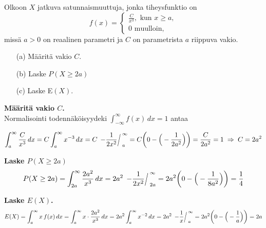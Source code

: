 \documentclass[12pt,a4paper]{article}
\begin{document}
\pagebreak
{}
Olkoon $X$ jatkuva satunnaismuuttuja, jonka tiheysfunktio on 
$$f(x)=\begin{cases}
    \frac{C}{x^{3}},\text{ kun }x\ge a,\\
    0 \text{ muulloin,}
\end{cases}$$
missä $a>0$ on reaalinen parametri ja $C$ on parametrista $a$ riippuva vakio. 
\begin{enumerate}
    \item[(a)] Määritä vakio $C$. 
    \item[(b)] Laske $P(X\ge 2a)$
    \item[(c)] Laske E$(X)$. 
\end{enumerate}

\vspace{0.4cm}

\begin{comment}
    

\end{comment}

\begin{kohta}
  \item \textbf{Määritä vakio $C$.} \\
  Normalisointi todennäköisyydeki $\int_{-\infty}^{\infty} f(x)\,dx=1$ antaa

  \[
    \int_a^\infty \frac{C}{x^{3}}\,dx
    = C\int_a^\infty x^{-3}\,dx
    = C\,\evalslant{-\frac{1}{2x^{2}}}{a}{\infty}
    = C\!\left(0-\Big(-\frac{1}{2a^{2}}\Big)\right)
    = \frac{C}{2a^{2}} = 1
    \;\Rightarrow\; C=2a^{2}
  \]

  \item \textbf{Laske $P(X\ge 2a)$}
  \[
    P(X\ge 2a)
    = \int_{2a}^{\infty} \frac{2a^{2}}{x^{3}}\,dx
    = 2a^{2}\,\evalslant{-\frac{1}{2x^{2}}}{2a}{\infty}
    = 2a^{2}\!\left(0-\Big(-\frac{1}{8a^{2}}\Big)\right)
    = \frac{1}{4}
  \]

  \item \textbf{Laske $E(X)$.}
  \[
    E(X)=\int_{a}^{\infty} x\,f(x)\,dx
    = \int_{a}^{\infty} x\cdot\frac{2a^{2}}{x^{3}}\,dx
    = 2a^{2}\int_{a}^{\infty} x^{-2}\,dx
    = 2a^{2}\,\evalslant{-\frac{1}{x}}{a}{\infty}
    = 2a^{2}\!\left(0-\Big(-\frac{1}{a}\Big)\right)
    = 2a
  \]
\end{kohta}
\end{document}
